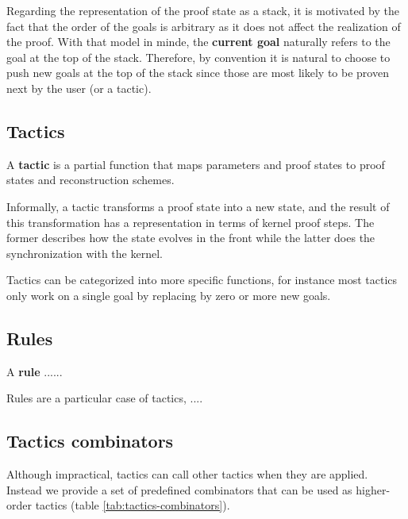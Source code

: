 Regarding the representation of the proof state as a stack, it is motivated by the fact that the order of the goals is arbitrary as it does not affect the realization of the proof. With that model in minde, the \textbf{current goal} naturally refers to the goal at the top of the stack. Therefore, by convention it is natural to choose to push new goals at the top of the stack since those are most likely to be proven next by the user (or a tactic).

\subsection{Tactics}

\begin{definition}[Tactic]
A \textbf{tactic} is a partial function that maps parameters and proof states to proof states and reconstruction schemes.
\end{definition}

Informally, a tactic transforms a proof state into a new state, and the result of this transformation has a representation in terms of kernel proof steps. The former describes how the state evolves in the front while the latter does the synchronization with the kernel.

Tactics can be categorized into more specific functions, for instance most tactics only work on a single goal by replacing by zero or more new goals.

\subsection{Rules}
\label{sec:proof-framework-rules}

\begin{definition}[Rule]
A \textbf{rule} ......
\end{definition}

Rules are a particular case of tactics, ....

\subsection{Tactics combinators}

Although impractical, tactics can call other tactics when they are applied. Instead we provide a set of predefined combinators that can be used as higher-order tactics (table \ref{tab:tactics-combinators}).

